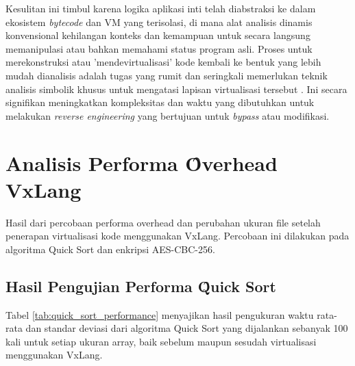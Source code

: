  Kesulitan ini timbul karena logika aplikasi inti telah diabstraksi ke dalam ekosistem \textit{bytecode} dan VM yang terisolasi, di mana alat analisis dinamis konvensional kehilangan konteks dan kemampuan untuk secara langsung memanipulasi atau bahkan memahami status program asli. Proses untuk merekonstruksi atau 'mendevirtualisasi' kode kembali ke bentuk yang lebih mudah dianalisis adalah tugas yang rumit dan seringkali memerlukan teknik analisis simbolik khusus untuk mengatasi lapisan virtualisasi tersebut \cite{Salwan2018SymbolicDeobfuscation}. Ini secara signifikan meningkatkan kompleksitas dan waktu yang dibutuhkan untuk melakukan \textit{reverse engineering} yang bertujuan untuk \textit{bypass} atau modifikasi.

\section{Analisis Performa \f{Overhead} VxLang}
Hasil dari percobaan performa overhead dan perubahan ukuran file setelah penerapan virtualisasi kode menggunakan VxLang. Percobaan ini dilakukan pada algoritma Quick Sort dan enkripsi AES-CBC-256.

\subsection{Hasil Pengujian Performa \f{Quick Sort}}
Tabel \ref{tab:quick_sort_performance} menyajikan hasil pengukuran waktu rata-rata dan standar deviasi dari algoritma Quick Sort yang dijalankan sebanyak 100 kali untuk setiap ukuran array, baik sebelum maupun sesudah virtualisasi menggunakan VxLang. 

